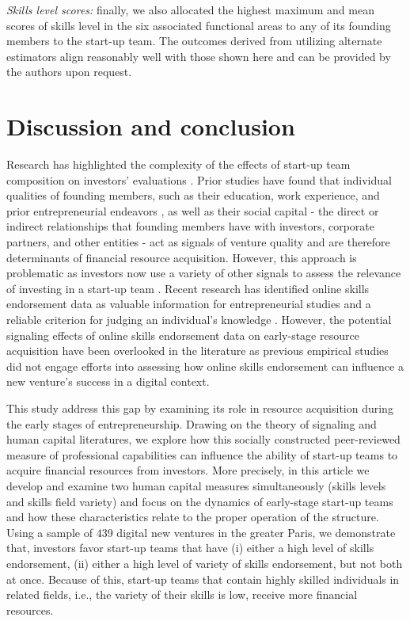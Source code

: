 \documentclass[12pt]{article}
\begin{document}
\textit{Skills level scores:} finally, we also allocated the highest maximum and mean scores of skills level in the six associated functional areas to any of its founding members to the start-up team. The outcomes derived from utilizing alternate estimators align reasonably well with those shown here and can be provided by the authors upon request.

\section{Discussion and conclusion}

Research has highlighted the complexity of the effects of start-up team composition on investors' evaluations \citep{cooper1994initial, ghassemiautomated}. Prior studies have found that individual qualities of founding members, such as their education, work experience, and prior entrepreneurial endeavors \citep{shane2002network, hsu2007experienced}, as well as their social capital - the direct or indirect relationships that founding members have with investors, corporate partners, and other entities \citep{shane2002network, hsu2007experienced, huang2017resources} - act as signals of venture quality and are therefore determinants of financial resource acquisition. However, this approach is problematic as investors now use a variety of other signals to assess the relevance of investing in a start-up team \citep{banerji2019startup, mollick2014dynamics, courtney2017resolving}. Recent research has identified online skills endorsement data \citep{gasiorowski2022pay, perez2016endorsement, wu2018analysis} as valuable information for entrepreneurial studies and a reliable criterion for judging an individual's knowledge \citep{rapanta2017linkedin, reese2020should, sako2020scaling}. However, the potential signaling effects of online skills endorsement data on early-stage resource acquisition have been overlooked in the literature as previous empirical studies did not engage efforts into assessing how online skills endorsement can influence a new venture's success in a digital context.

This study address this gap by examining its role in resource acquisition during the early stages of entrepreneurship. Drawing on the theory of signaling and human capital literatures, we explore how this socially constructed peer-reviewed measure of professional capabilities can influence the ability of start-up teams to acquire financial resources from investors. More precisely, in this article we develop and examine two human capital measures simultaneously (skills levels and skills field variety) and focus on the dynamics of early-stage start-up teams and how these characteristics relate to the proper operation of the structure. Using a sample of 439 digital new ventures in the greater Paris, we demonstrate that, investors favor start-up teams that have (i) either a high level of skills endorsement, (ii) either a high level of variety of skills endorsement, but not both at once. Because of this, start-up teams that contain highly skilled individuals in related fields, i.e., the variety of their skills is low, receive more financial resources.
\end{document}

